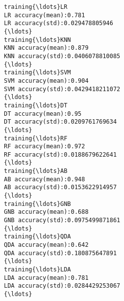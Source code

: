 \documentclass[11pt]{article}
\begin{document}
    \begin{Verbatim}[commandchars=\\\{\}]
training{\ldots}LR
LR accuracy(mean):0.781
LR accuracy(std):0.029478805946
{\ldots}
training{\ldots}KNN
KNN accuracy(mean):0.879
KNN accuracy(std):0.0406078810085
{\ldots}
training{\ldots}SVM
SVM accuracy(mean):0.904
SVM accuracy(std):0.0429418211072
{\ldots}
training{\ldots}DT
DT accuracy(mean):0.95
DT accuracy(std):0.0209761769634
{\ldots}
training{\ldots}RF
RF accuracy(mean):0.972
RF accuracy(std):0.0188679622641
{\ldots}
training{\ldots}AB
AB accuracy(mean):0.948
AB accuracy(std):0.0153622914957
{\ldots}
training{\ldots}GNB
GNB accuracy(mean):0.688
GNB accuracy(std):0.0975499871861
{\ldots}
training{\ldots}QDA
QDA accuracy(mean):0.642
QDA accuracy(std):0.180875647891
{\ldots}
training{\ldots}LDA
LDA accuracy(mean):0.781
LDA accuracy(std):0.0284429253067
{\ldots}

    \end{Verbatim}
\end{document}
